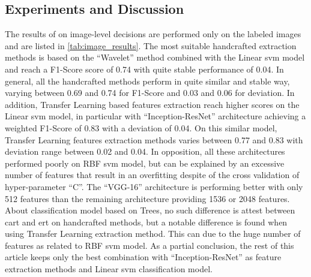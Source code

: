\documentclass[journal,article,submit,moreauthors,pdftex, applsci]{Definitions/mdpi}
\begin{document}
\subsection{Experiments and Discussion}
The results of  on image-level decisions are performed only on the labeled images and are listed in \cref{tab:image_results}. The most suitable handcrafted extraction methods is based on the “Wavelet” method combined with the Linear \ac{svm} model and reach a F1-Score score of 0.74 with quite stable performance of 0.04. In general, all the handcrafted methods perform in quite similar and stable way, varying between 0.69 and 0.74 for F1-Score and 0.03 and 0.06 for deviation. In addition, Transfer Learning based features extraction reach higher scores on the Linear \ac{svm} model, in particular with “Inception-ResNet” architecture achieving a weighted F1-Score of 0.83 with a deviation of 0.04. On this similar model, Transfer Learning features extraction methods varies between 0.77 and 0.83 with deviation range between 0.02 and 0.04. In opposition, all these architectures performed poorly on RBF \ac{svm} model, but can be explained by an excessive number of features that result in an overfitting despite of the cross validation of hyper-parameter “C”. The “VGG-16” architecture is performing better with only 512 features than the remaining architecture providing 1536 or 2048 features. About classification model based on Trees, no such difference is attest between \ac{cart} and \ac{ert} on handcrafted methods, but a notable difference is found when using Transfer Learning extraction method. This can due to the huge number of features as related to RBF \ac{svm} model. As a partial conclusion, the rest of this article keeps only the best combination with “Inception-ResNet” as feature extraction methods and Linear \ac{svm} classification model.\par
\end{document}
